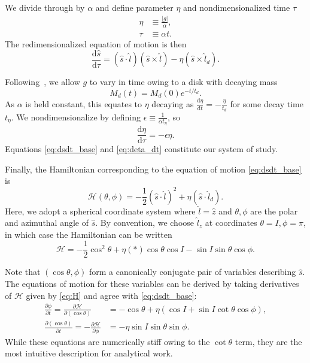 \documentclass[
        fleqn,
        usenatbib,
    ]{mnras}
\newcommand*{\rd}[2]{\frac{\mathrm{d}#1}{\mathrm{d}#2}}
\newcommand*{\pd}[2]{\frac{\partial#1}{\partial#2}}
\newcommand*{\abs}[1]{\left|#1\right|}
\newcommand*{\p}[1]{\left(#1\right)}
\begin{document}
We divide through by $\alpha$ and define parameter $\eta$ and nondimensionalized
time $\tau$
\begin{align}
    \eta &\equiv \frac{\abs{g}}{\alpha}\label{eq:eta},\\
    \tau &\equiv \alpha t.
\end{align}
The redimensionalized equation of motion is then
\begin{equation}
    \rd{\hat{s}}{\tau} = \p{\hat{s} \cdot \hat{l}}
            \p{\hat{s} \times \hat{l}}
        - \eta\p{\hat{s} \times \hat{l}_d}. \label{eq:dsdt_base}
\end{equation}

Following~\cite{millholland_disk}, we allow $g$ to vary in time owing to a
disk with decaying mass
\begin{equation}
    M_d(t) = M_d(0)e^{-t/t_d}.
\end{equation}
As $\alpha$ is held constant, this equates to $\eta$ decaying as $\rd{\eta}{t} =
-\frac{\eta}{t_d}$ for some decay time $t_\eta$. We nondimensionalize by
defining $\epsilon \equiv \frac{1}{\alpha t_\eta}$, so
\begin{equation}
    \rd{\eta}{\tau} = -\epsilon \eta.\label{eq:deta_dt}
\end{equation}
Equations \autoref{eq:dsdt_base} and \autoref{eq:deta_dt} constitute our system
of study.

Finally, the Hamiltonian corresponding to the equation of motion
\autoref{eq:dsdt_base} is
\begin{equation}
    \mathcal{H}\p{\theta, \phi} = -\frac{1}{2}\p{\hat{s} \cdot \hat{l}}^2
        + \eta \p{\hat{s} \cdot \hat{l}_d}.\label{eq:H}
\end{equation}
Here, we adopt a spherical coordinate system where $\hat{l} = \hat{z}$ and
$\theta, \phi$ are the polar and azimuthal angle of $\hat{s}$. By convention, we
choose $\hat{l}_z$ at coordinates $\theta = I, \phi = \pi$, in which case the
Hamiltonian can be written
\begin{equation}
    \mathcal{H} = -\frac{1}{2}\cos^2\theta
        + \eta \p*{\cos \theta \cos I - \sin I \sin \theta \cos \phi}.
\end{equation}

Note that $\p{\cos \theta, \phi}$ form a canonically conjugate pair of variables
describing $\hat{s}$. The equations of motion for these variables can be derived
by taking derivatives of $\mathcal{H}$ given by \autoref{eq:H} and agree with
\autoref{eq:dsdt_base}:
\begin{subequations}\label{se:H_eom}
    \begin{align}
        \pd{\phi}{t} = \pd{\mathcal{H}}{(\cos\theta)}
            &= -\cos\theta + \eta\p{\cos I + \sin I \cot \theta \cos \phi},\\
        \pd{(\cos \theta)}{t} = -\pd{\mathcal{H}}{\phi}
            &= -\eta \sin I \sin \theta \sin \phi.
    \end{align}
\end{subequations}
While these equations are numerically stiff owing to the $\cot\theta$ term, they
are the most intuitive description for analytical work.
\end{document}
